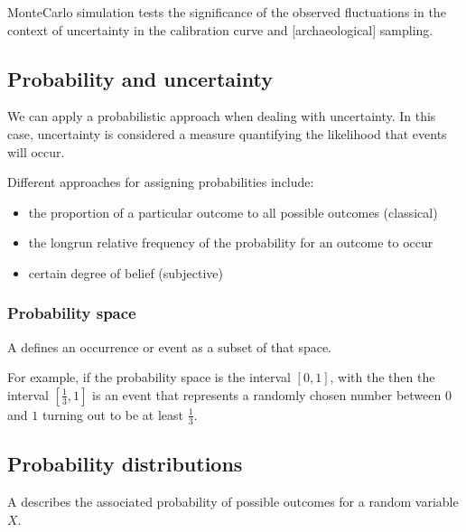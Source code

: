 \documentclass[a4paper,12pt,english]{sphinxhowto}
\begin{document}
Monte\sphinxhyphen{}Carlo simulation tests the significance of the observed fluctuations in the context
of uncertainty in the calibration curve and {[}archaeological{]} sampling.



\subsection{Probability and uncertainty}
\label{\detokenize{Uncertainty:probability-and-uncertainty}}
We can apply a probabilistic approach when dealing with uncertainty.
In this case, uncertainty is considered a measure quantifying the likelihood that events will occur.

Different approaches for assigning probabilities include:
\begin{itemize}
\item {} 
the proportion of a particular outcome to all possible outcomes (classical)

\item {} 
the long\sphinxhyphen{}run relative frequency of the probability for an outcome to occur

\item {} 
certain degree of belief (subjective)

\end{itemize}



\subsubsection{Probability space}
\label{\detokenize{Uncertainty:probability-space}}
A  defines an occurrence or event as a subset of that space.

For example, if the probability space is the interval \([0,1]\), with the {\hyperref[\detokenize{Uncertainty:unif}]{}} then the interval
\([ \frac{1}{3}, 1 ]\) is an event that represents a randomly chosen number between \(0\) and \(1\)
turning out to be at least \(\frac{1}{3}\).



\subsection{Probability distributions}
\label{\detokenize{Uncertainty:probability-distributions}}
A  describes the associated probability of possible outcomes for a random variable \(X\).
\end{document}
